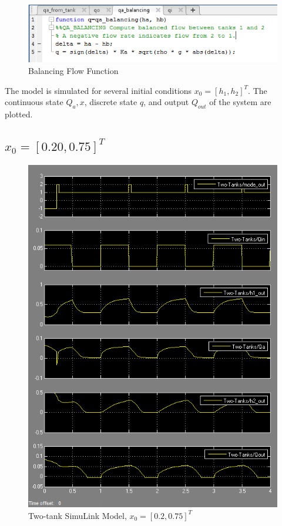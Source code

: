 \documentclass[letterpaper]{article}
\begin{document}
\begin{figure}[h!]
\centering
\includegraphics[scale=0.7]{hw8_qa_balancing_fn.png}
\caption{Balancing Flow Function}
\label{fig:q_balancing}
\end{figure}


The model is simulated for several initial conditions $x_0 = [h_1, h_2]^T$.
The continuous state $Q_{a}, x$, discrete state $q$, and 
output $Q_{out}$ of the system are plotted.

\subsection{$x_0 = [0.20, 0.75]^T$}

\begin{figure}[h!]
\centering
\includegraphics[scale=0.7]{hw8_20_75.png}
\caption{Two-tank SimuLink Model, $x_0 = [0.2, 0.75]^T$ }
\label{fig:two-tank-model-20-75}
\end{figure}
\end{document}
